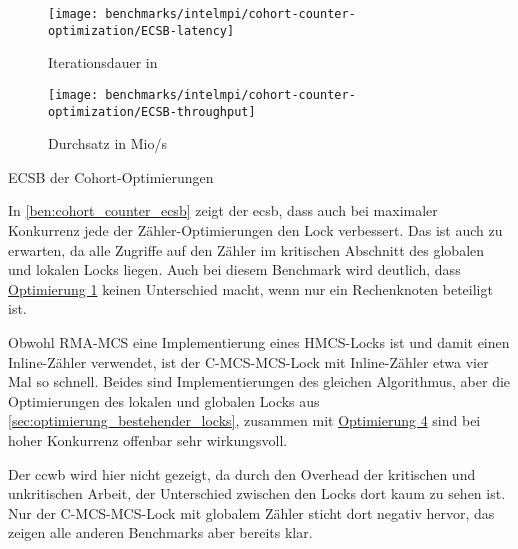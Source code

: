 \begin{benchmark}[h]
    \begin{subfigure}{.5\textwidth}
        \texttt{[image: benchmarks/intelmpi/cohort-counter-optimization/ECSB-latency]}
        \caption{Iterationsdauer in }
        \label{ben:cohort_counter_ecsb_latency}
    \end{subfigure}
    \begin{subfigure}{.5\textwidth}
        \texttt{[image: benchmarks/intelmpi/cohort-counter-optimization/ECSB-throughput]}
        \caption{Durchsatz in Mio/s}
        \label{ben:cohort_counter_ecsb_throughput}
    \end{subfigure}
    \caption{ECSB der Cohort-Optimierungen}
    \label{ben:cohort_counter_ecsb}
\end{benchmark}

In \autoref{ben:cohort_counter_ecsb} zeigt der \gls{ecsb},
dass auch bei maximaler \gls{Konkurrenz} jede der Zähler-Optimierungen den Lock verbessert.
Das ist auch zu erwarten,
da alle Zugriffe auf den Zähler im kritischen Abschnitt des globalen und lokalen Locks liegen.
Auch bei diesem Benchmark wird deutlich,
dass \hyperref[sec:cohort_opt_1]{Optimierung 1} keinen Unterschied macht,
wenn nur ein Rechenknoten beteiligt ist.

Obwohl RMA-MCS eine Implementierung eines HMCS-Locks ist
und damit einen Inline-Zähler verwendet,
ist der C-MCS-MCS-Lock mit Inline-Zähler etwa vier Mal so schnell.
Beides sind Implementierungen des gleichen Algorithmus,
aber die Optimierungen des lokalen und globalen Locks aus \autoref{sec:optimierung_bestehender_locks},
zusammen mit \hyperref[sec:cohort_opt_4]{Optimierung 4} sind bei hoher \gls{Konkurrenz} offenbar sehr wirkungsvoll.

Der \gls{ccwb} wird hier nicht gezeigt,
da durch den Overhead der kritischen und unkritischen Arbeit,
der Unterschied zwischen den Locks dort kaum zu sehen ist.
Nur der C-MCS-MCS-Lock mit globalem Zähler sticht dort negativ hervor,
das zeigen alle anderen Benchmarks aber bereits klar.

\clearpage

